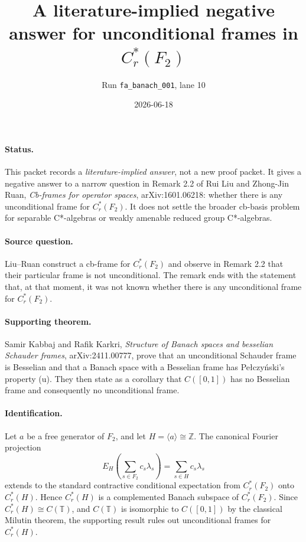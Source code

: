 \documentclass[11pt]{article}
\title{A literature-implied negative answer for unconditional frames in \(C_r^*(F_2)\)}
\author{Run \texttt{fa\_banach\_001}, lane 10}
\date{2026-06-18}
\begin{document}
\maketitle

\paragraph{Status.}
This packet records a \emph{literature-implied answer}, not a new proof packet.
It gives a negative answer to a narrow question in Remark 2.2 of Rui Liu and
Zhong-Jin Ruan, \emph{Cb-frames for operator spaces}, arXiv:1601.06218: whether
there is any unconditional frame for \(C_r^*(F_2)\).  It does not settle the
broader cb-basis problem for separable C*-algebras or weakly amenable reduced
group C*-algebras.

\paragraph{Source question.}
Liu--Ruan construct a cb-frame for \(C_r^*(F_2)\) and observe in Remark 2.2 that
their particular frame is not unconditional.  The remark ends with the statement
that, at that moment, it was not known whether there is any unconditional frame
for \(C_r^*(F_2)\).

\paragraph{Supporting theorem.}
Samir Kabbaj and Rafik Karkri, \emph{Structure of Banach spaces and besselian
Schauder frames}, arXiv:2411.00777, prove that an unconditional Schauder frame
is Besselian and that a Banach space with a Besselian frame has
Pe\l czy\'nski's property (u).  They then state as a corollary that
\(C([0,1])\) has no Besselian frame and consequently no unconditional frame.

\paragraph{Identification.}
Let \(a\) be a free generator of \(F_2\), and let \(H=\langle a\rangle\cong
\mathbb Z\).  The canonical Fourier projection
\[
  E_H\left(\sum_{s\in F_2} c_s\lambda_s\right)
  =
  \sum_{s\in H} c_s\lambda_s
\]
extends to the standard contractive conditional expectation from
\(C_r^*(F_2)\) onto \(C_r^*(H)\).  Hence \(C_r^*(H)\) is a complemented Banach
subspace of \(C_r^*(F_2)\).  Since \(C_r^*(H)\cong C(\mathbb T)\), and
\(C(\mathbb T)\) is isomorphic to \(C([0,1])\) by the classical Milutin theorem,
the supporting result rules out unconditional frames for \(C_r^*(H)\).
\end{document}

